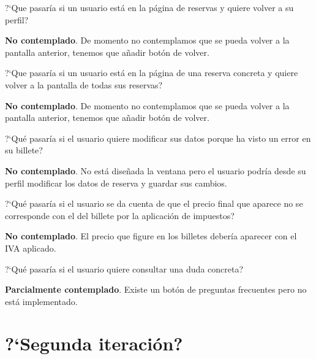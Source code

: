 \begin{escenario} %
    \centering
?`Que pasaría si un usuario está en la página de reservas y quiere volver a su perfil? 

\begin{solucion} \centering
    \textbf{No contemplado}. De momento no contemplamos que se pueda volver a la pantalla anterior, tenemos que añadir botón de volver. 
\end{solucion}
\end{escenario}

\begin{escenario} %
    \centering
?`Que pasaría si un usuario está en la página de una reserva concreta y quiere volver a la pantalla de todas sus reservas?

\begin{solucion} \centering
    \textbf{No contemplado}. De momento no contemplamos que se pueda volver a la pantalla anterior, tenemos que añadir botón de volver. 
\end{solucion}
\end{escenario}

\begin{escenario} %
    \centering
?`Qué pasaría si el usuario quiere modificar sus datos porque ha visto un error en su billete? 

\begin{solucion} \centering
    \textbf{No contemplado}.  No está diseñada la ventana pero el usuario podría desde su perfil modificar los datos de reserva y guardar sus cambios.
\end{solucion}
\end{escenario}

\begin{escenario} %
    \centering
?`Qué pasaría si el usuario se da cuenta de que el precio final que aparece no se corresponde con el del billete por la aplicación de impuestos?

\begin{solucion} \centering
    \textbf{No contemplado}. El precio que figure en los billetes debería aparecer con el IVA aplicado.

\end{solucion}
\end{escenario}

\begin{escenario} %
    \centering
?`Qué pasaría si el usuario quiere consultar una duda concreta?

\begin{solucion}
    \centering
    \textbf{Parcialmente contemplado}. Existe un botón de preguntas frecuentes pero no está implementado.
\end{solucion}
\end{escenario}

\section{?`Segunda iteración?}
